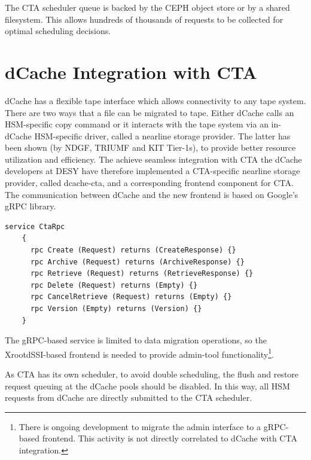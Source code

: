 \documentclass{webofc}
\begin{document}
The CTA scheduler queue is backed by the CEPH\cite{ceph} object store or by a shared filesystem. This allows hundreds of thousands of requests to be collected for optimal scheduling decisions.

\section{dCache Integration with CTA}
\label{sec:integration}

dCache has a flexible tape interface which allows connectivity to any tape system. There are two ways that a file can be migrated to tape. Either dCache calls an HSM-specific copy command or it interacts with the tape system via an in-dCache HSM-specific driver, called a nearline storage provider. The latter has been shown (by NDGF, TRIUMF and KIT Tier-1s), to provide better resource utilization and efficiency\cite{endit_kit}. The achieve seamless integration with CTA the dCache developers at DESY have therefore implemented a CTA-specific nearline storage provider, called dcache-cta\cite{dcache_cta}, and a corresponding frontend component for CTA. The communication between dCache and the new frontend is based on Google’s gRPC library.

\begin{lstlisting}[label=grpc-frontend,caption={gRPC service definition},keywords={service,rpc,returns}]
    service CtaRpc
    {
      rpc Create (Request) returns (CreateResponse) {}
      rpc Archive (Request) returns (ArchiveResponse) {}
      rpc Retrieve (Request) returns (RetrieveResponse) {}
      rpc Delete (Request) returns (Empty) {}
      rpc CancelRetrieve (Request) returns (Empty) {}
      rpc Version (Empty) returns (Version) {}
    }
\end{lstlisting}

The gRPC-based service is limited to data migration operations, so the XrootdSSI-based frontend is needed to provide admin-tool functionality\footnote{There is ongoing development to migrate the admin interface to a gRPC-based\cite{grpc} frontend. This activity is not directly correlated to dCache with CTA integration.}.

As CTA has its own scheduler, to avoid double scheduling,  the flush and restore request queuing at the dCache pools should be disabled. In this way, all HSM requests from dCache are directly submitted to the CTA scheduler.
\end{document}
